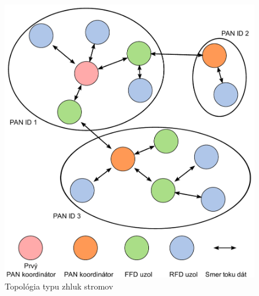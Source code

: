 \begin{figure}[htbp]
\begin{center}
\includegraphics[width=120mm]{figures/topology_cluster}
\caption{Topológia typu zhluk stromov}
\label{fig:topology_cluster}
\end{center}
\end{figure} 
